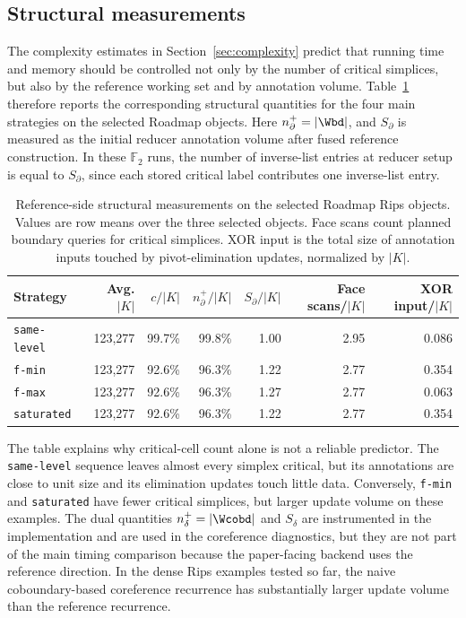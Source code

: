 \subsection{Structural measurements}

The complexity estimates in Section~\ref{sec:complexity} predict that running time and
memory should be controlled not only by the number of critical simplices, but also by the
reference working set and by annotation volume.  Table~\ref{tab:paper-structural-roadmap}
therefore reports the corresponding structural quantities for the four main strategies on
the selected Roadmap objects.  Here \(n_\partial^+=|\Wbd|\), and \(S_\partial\) is measured
as the initial reducer annotation volume after fused reference construction.  In these
\(\mathbb{F}_2\) runs, the number of inverse-list entries at reducer setup is equal to
\(S_\partial\), since each stored critical label contributes one inverse-list entry.

\begin{table}[t]
\centering
\small
\begin{tabular}{lrrrrrr}
\toprule
Strategy & Avg. \(|K|\) & \(c/|K|\) & \(n_\partial^+/|K|\)
  & \(S_\partial/|K|\) & Face scans/\(|K|\) & XOR input/\(|K|\) \\
\midrule
\texttt{same-level} & 123,277 & 99.7\% & 99.8\% & 1.00 & 2.95 & 0.086 \\
\texttt{f-min}      & 123,277 & 92.6\% & 96.3\% & 1.22 & 2.77 & 0.354 \\
\texttt{f-max}      & 123,277 & 92.6\% & 96.3\% & 1.27 & 2.77 & 0.063 \\
\texttt{saturated}  & 123,277 & 92.6\% & 96.3\% & 1.22 & 2.77 & 0.354 \\
\bottomrule
\end{tabular}
\caption{Reference-side structural measurements on the selected Roadmap Rips objects.
Values are row means over the three selected objects.  Face scans count planned boundary
queries for critical simplices.  XOR input is the total size of annotation inputs touched
by pivot-elimination updates, normalized by \(|K|\).}
\label{tab:paper-structural-roadmap}
\end{table}

The table explains why critical-cell count alone is not a reliable predictor.  The
\texttt{same-level} sequence leaves almost every simplex critical, but its annotations are
close to unit size and its elimination updates touch little data.  Conversely,
\texttt{f-min} and \texttt{saturated} have fewer critical simplices, but larger update
volume on these examples.  The dual quantities \(n_\delta^+=|\Wcobd|\) and \(S_\delta\)
are instrumented in the implementation and are used in the coreference diagnostics, but
they are not part of the main timing comparison because the paper-facing backend uses the
reference direction.  In the dense Rips examples tested so far, the naive coboundary-based
coreference recurrence has substantially larger update volume than the reference
recurrence.

